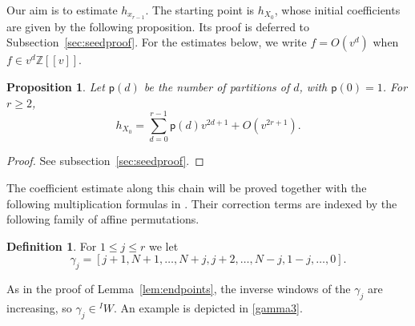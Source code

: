 \documentclass[11pt,a4paper,reqno]{amsart}
\numberwithin{equation}{section}
\newtheorem{proposition}[theorem]{Proposition}
\theoremstyle{definition}
\newtheorem{definition}[theorem]{Definition}
\theoremstyle{remark}
\theoremstyle{plain}
\newcommand{\Part}{\mathsf p}
\begin{document}
Our aim is to estimate $h_{x_{r-1}}$. The starting point is
$h_{X_0}$, whose initial coefficients are given by the following
proposition. Its proof is deferred to Subsection~\ref{sec:seedproof}.
For the estimates below, we write $f=O(v^d)$ when
$f\in v^d\mathbb Z[[v]]$.
\begin{proposition}\label{prop:seed}
Let $\Part(d)$ be the number of partitions of $d$, with
$\Part(0)=1$. For $r\geq2$,
\begin{equation}\label{eq:seed}
 h_{X_0}=\sum_{d=0}^{r-1}\Part(d)v^{2d+1}+O(v^{2r+1}).
\end{equation}
\end{proposition}
\begin{proof}
     See subsection~\ref{sec:seedproof}.
\end{proof}
The coefficient estimate along this chain will be proved together
with the following multiplication formulas in . Their correction terms are indexed by
the following family of affine permutations.

\begin{definition}\label{def:gamma}
For $1\leq j\leq r$  we let 
\[
 \gamma_j=[j+1,N+1,\ldots,N+j,j+2,\ldots,N-j,1-j,\ldots,0].
\]
 \end{definition}
As in the proof of Lemma~\ref{lem:endpoints}, the inverse windows of the 
$\gamma_j$ 
are increasing, so $\gamma_j\in{}^I W$. An example is depicted in \cref{gamma3}.
\end{document}
